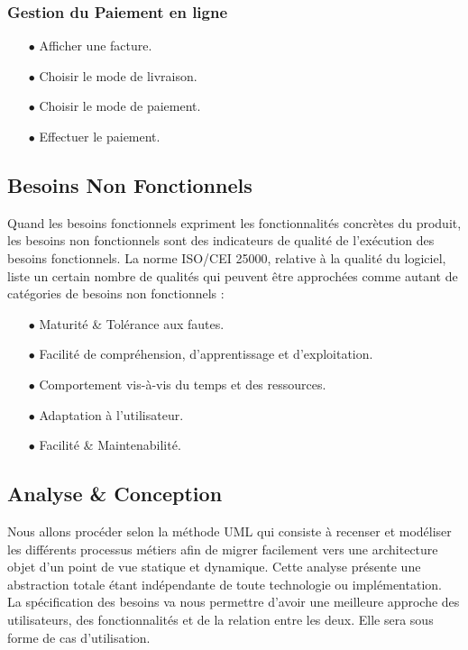\subsection{Gestion du Paiement en ligne}
\vspace{.3cm}
\begin{itemize}
\item[$\bullet$] Afficher une facture.
\item[$\bullet$] Choisir le mode de livraison.
\item[$\bullet$] Choisir le mode de paiement.
\item[$\bullet$] Effectuer le paiement.
\end{itemize}
\vspace{1cm}
\section{Besoins Non Fonctionnels}
\vspace{.5cm}

Quand les besoins fonctionnels expriment les fonctionnalités concrètes du produit, les besoins non fonctionnels sont des indicateurs de qualité de l’exécution des besoins fonctionnels. La norme ISO/CEI 25000, relative à la qualité du logiciel, liste un certain nombre de qualités qui peuvent être approchées comme autant de catégories de besoins non fonctionnels :
\vspace{.3cm}
\begin{itemize}
\item[$\bullet$] Maturité \& Tolérance aux fautes.
\item[$\bullet$] Facilité de compréhension, d’apprentissage et d’exploitation.
\item[$\bullet$] Comportement vis-à-vis du temps et des ressources.
\item[$\bullet$] Adaptation à l'utilisateur.
\item[$\bullet$] Facilité \& Maintenabilité.
\end{itemize}



\begin{center}
\chapter{Analyse \& Conception}
\end{center}

Nous allons procéder selon la méthode UML qui consiste à recenser et modéliser les différents processus métiers afin de migrer facilement vers une architecture objet d’un point de vue statique et dynamique. Cette analyse présente une abstraction totale étant indépendante de toute technologie ou implémentation.
\vspace{.3cm}\\
La spécification des besoins va nous permettre d’avoir une meilleure approche des utilisateurs, des fonctionnalités et de la relation entre les deux. Elle sera sous forme de cas d’utilisation.

